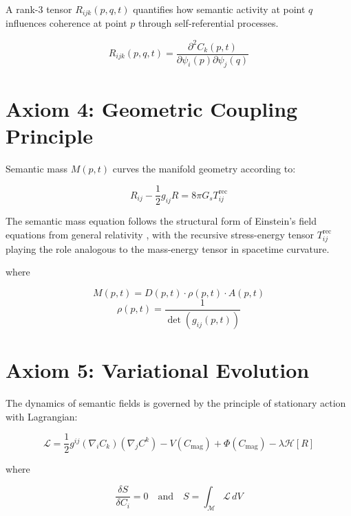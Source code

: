 A rank-3 tensor \(R_{ijk}(p,q,t)\) quantifies how semantic activity at point \(q\) influences coherence at point \(p\) through self-referential processes.

\begin{equation}
R_{ijk}(p,q,t) = \frac{\partial^2 C_k(p,t)}{\partial \psi_i(p) \partial \psi_j(q)}
\end{equation}

\section{Axiom 4: Geometric Coupling Principle}

Semantic mass \(M(p,t)\) curves the manifold geometry according to:

\begin{equation}
R_{ij} - \frac{1}{2}g_{ij}R = 8\pi G_s T^{\text{rec}}_{ij}
\end{equation}

The semantic mass equation follows the structural form of Einstein's field equations from general relativity \autocite{Einstein1915, MisnerThorneWheeler1973}, with the recursive stress-energy tensor \(T^{\text{rec}}_{ij}\) playing the role analogous to the mass-energy tensor in spacetime curvature.

where

\begin{equation}
M(p,t) = D(p,t) \cdot \rho(p,t) \cdot A(p,t)
\end{equation}
\begin{equation}
\rho(p,t) = \frac{1}{\det(g_{ij}(p,t))}
\end{equation}

\section{Axiom 5: Variational Evolution}

The dynamics of semantic fields is governed by the principle of stationary action with Lagrangian:

\begin{equation}
\mathcal{L} = \frac{1}{2} g^{ij} (\nabla_i C_k)(\nabla_j C^k) - V(C_{\text{mag}}) + \Phi(C_{\text{mag}}) - \lambda \mathcal{H}[R]
\end{equation}

where

\begin{equation}
\frac{\delta S}{\delta C_i} = 0 \quad \text{and} \quad S = \int_{\mathcal{M}} \mathcal{L} \, dV
\end{equation}

